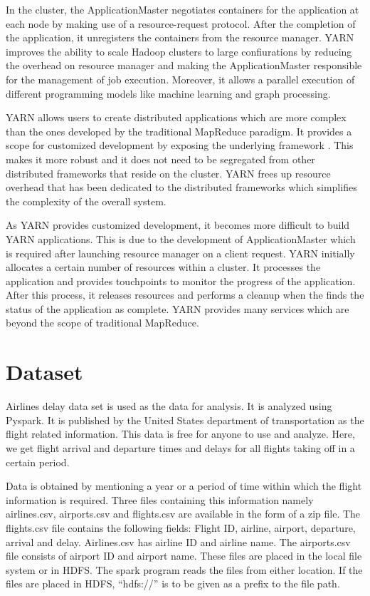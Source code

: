 \documentclass[9pt,twocolumn,twoside]{../../styles/osajnl}
\begin{document}
In the cluster, the ApplicationMaster negotiates containers for the
application at each node by making use of a resource-request
protocol. After the completion of the application, it unregisters the
containers from the resource manager. YARN improves the ability to
scale Hadoop clusters to large confiurations by reducing the overhead
on resource manager and making the ApplicationMaster responsible for
the management of job execution. Moreover, it allows a parallel
execution of different programming models like machine learning and
graph processing.

YARN allows users to create distributed applications which are more
complex than the ones developed by the traditional MapReduce
paradigm. It provides a scope for customized development by exposing
the underlying framework \cite{yarnIbm}. This makes it more robust and
it does not need to be segregated from other distributed frameworks
that reside on the cluster. YARN frees up resource overhead that has
been dedicated to the distributed frameworks which simplifies the
complexity of the overall system.

As YARN provides customized development, it becomes more difficult to
build YARN applications. This is due to the development of
ApplicationMaster which is required after launching resource manager
on a client request. YARN initially allocates a certain number of
resources within a cluster. It processes the application and provides
touchpoints to monitor the progress of the application. After this
process, it releases resources and performs a cleanup when the finds
the status of the application as complete. YARN provides many services
which are beyond the scope of traditional MapReduce. 


\section{Dataset}

Airlines delay data set is used as the data for analysis. It is
analyzed using Pyspark. It is published by the United States
department of transportation as the flight related information. This
data is free for anyone to use and analyze. Here, we get flight
arrival and departure times and delays for all flights taking off in a
certain period.

Data is obtained by mentioning a year or a period of time within which
the flight information is required. Three files containing this
information namely airlines.csv, airports.csv and flights.csv are
available in the form of a zip file. The flights.csv file contains the
following fields: Flight ID, airline, airport, departure, arrival and
delay. Airlines.csv has airline ID and airline name. The airports.csv
file consists of airport ID and airport name. These files are placed
in the local file system or in HDFS. The spark program reads the files
from either location. If the files are placed in HDFS, “hdfs://” is
to be given as a prefix to the file path.
\end{document}
